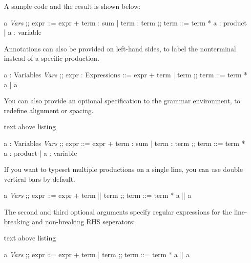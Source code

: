 \documentclass[a4paper]{article}
\begin{document}
A sample code and the result is shown below:
\begin{exampleside}
  \begin{bnfgrammar}
    a \in \textit{Vars}
    ;;
    expr ::=
      expr + term : sum
    | term        : term
    ;;
    term ::=
      term * a : product
    | a        : variable
  \end{bnfgrammar}
\end{exampleside}

Annotations can also be provided on left-hand sides, to label the nonterminal instead of a specific production.
\begin{exampleside}
  \begin{bnfgrammar}
    a : Variables \in \textit{Vars}
    ;;
    expr : Expressions ::=
      expr + term
    | term
    ;;
    term ::=
      term * a
    | a
  \end{bnfgrammar}
\end{exampleside}

You can also provide an optional specification to the grammar environment, to redefine alignment or spacing.
\begin{tcblisting}{text above listing}
  \begin{bnfgrammar}
    a : Variables \in \textit{Vars}
    ;;
    expr ::=
      expr + term : sum
    | term        : term
    ;;
    term ::=
      term * a : product
    | a        : variable
  \end{bnfgrammar}
\end{tcblisting}

If you want to typeset multiple productions on a single line, you can use double vertical bars by default.
\begin{exampleside}
  \begin{bnfgrammar}
    a \in \textit{Vars}
    ;;
    expr ::= expr + term || term
    ;;
    term ::= term * a || a
  \end{bnfgrammar}
\end{exampleside}

The second and third optional arguments specify regular expressions for the line-breaking and non-breaking RHS seperators:
\begin{tcblisting}{text above listing}
  \begin{bnfgrammar}[llcll][\|\|][\|]
    a \in \textit{Vars}
    ;;
    expr ::= expr + term | term
    ;;
    term ::= term * a
    || a
  \end{bnfgrammar}
\end{tcblisting}
\end{document}
